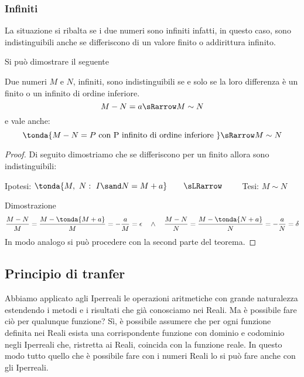 \subsubsection{Infiniti}
\label{subsubsec:insnum_infiniti}

La situazione si ribalta se i due numeri sono infiniti infatti, in 
questo caso, sono indistinguibili anche se differiscono di 
un valore finito o addirittura infinito. 

Si può dimostrare il seguente
\begin{teorema}
Due numeri \(M\) e \(N\), infiniti, 
sono indistinguibili se e solo se la loro differenza è un finito o 
un infinito di ordine inferiore.
\[M-N = a \sRarrow M \sim N\] 
e vale anche:
\[\tonda{M-N = P \text{ con P infinito di ordine inferiore }} 
\sRarrow M \sim N\] 
\end{teorema}
\begin{proof}
Di seguito dimostriamo che se differiscono per un finito allora 
sono indistinguibili:
\begin{center}
Ipotesi: \(\tonda{M,~N:\ I \sand N = M+a}
\qquad \sLRarrow\qquad\) 
Tesi: \(M \sim N\)
\end{center}
Dimostrazione
\[\frac{M-N}{M}=
\frac{M-\tonda{M +a}}{M} = 
-\frac{a}{M}= \epsilon \quad \wedge \quad 
\frac{M-N}{N}=
\frac{M-\tonda{N +a}}{N} = 
-\frac{a}{N}= \delta
\]
In modo analogo si può procedere con la second parte del teorema.
\end{proof}

\subsection{Principio di tranfer}
\label{subsec:insnum_nonarchimedei}

Abbiamo applicato agli Iperreali le operazioni aritmetiche con grande 
naturalezza estendendo i metodi e i risultati che già conosciamo nei Reali. 
Ma è possibile fare ciò per qualunque funzione? 
Sì, è possibile assumere che per ogni funzione definita nei Reali esista 
una 
corrispondente funzione con dominio e codominio negli Iperreali che, 
ristretta ai Reali, coincida con la funzione reale.
In questo modo tutto quello che è possibile fare con i numeri Reali lo si 
può 
fare anche con gli Iperreali.

